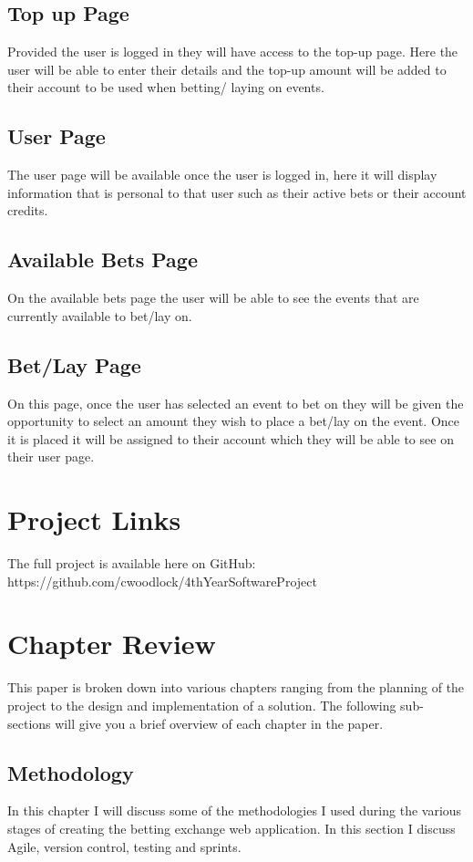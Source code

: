 \subsection{Top up Page}
Provided the user is logged in they will have access to the top-up page. Here the user will be able to enter their details and the top-up amount will be added to their account to be used when betting/ laying on events.

\subsection{User Page}
The user page will be available once the user is logged in, here it will display information that is personal to that user such as their active bets or their account credits.

\subsection{Available Bets Page}
On the available bets page the user will be able to see the events that are currently available to bet/lay on. 

\subsection{Bet/Lay Page}
On this page, once the user has selected an event to bet on they will be given the opportunity to select an amount they wish to place a bet/lay on the event. Once it is placed it will be assigned to their account which they will be able to see on their user page.

\section{Project Links}
The full project is available here on GitHub:
https://github.com/cwoodlock/4thYearSoftwareProject

\section{Chapter Review}
This paper is broken down into various chapters ranging from the planning of the project to the design and implementation of a solution. The following sub-sections will give you a brief overview of each chapter in the paper.

\subsection{Methodology}
In this chapter I will discuss some of the methodologies I used during the various stages of creating the betting exchange web application. In this section I discuss Agile, version control, testing and sprints.

